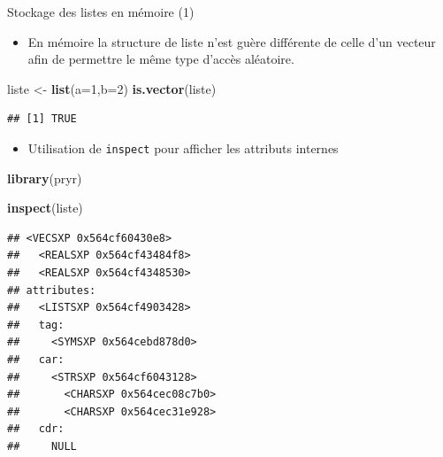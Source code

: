 \documentclass[
  ignorenonframetext,
]{beamer}
\newenvironment{Shaded}{\begin{snugshade}}{\end{snugshade}}
\newcommand{\AttributeTok}[1]{\textcolor[rgb]{0.13,0.29,0.53}{#1}}
\newcommand{\DecValTok}[1]{\textcolor[rgb]{0.00,0.00,0.81}{#1}}
\newcommand{\FunctionTok}[1]{\textcolor[rgb]{0.13,0.29,0.53}{\textbf{#1}}}
\newcommand{\NormalTok}[1]{#1}
\newcommand{\OtherTok}[1]{\textcolor[rgb]{0.56,0.35,0.01}{#1}}
\providecommand{\tightlist}{%
  \setlength{\itemsep}{0pt}\setlength{\parskip}{0pt}}
\begin{document}
\begin{frame}[fragile]{Stockage des listes en mémoire (1)}
\protect\hypertarget{stockage-des-listes-en-muxe9moire-1}{}
\begin{itemize}
\tightlist
\item
  En mémoire la structure de liste n'est guère différente de celle d'un
  vecteur afin de permettre le même type d'accès aléatoire.
\end{itemize}

\tiny

\begin{Shaded}
\begin{Highlighting}[]
\NormalTok{liste }\OtherTok{\textless{}{-}} \FunctionTok{list}\NormalTok{(}\AttributeTok{a=}\DecValTok{1}\NormalTok{,}\AttributeTok{b=}\DecValTok{2}\NormalTok{)}
\FunctionTok{is.vector}\NormalTok{(liste)}
\end{Highlighting}
\end{Shaded}

\begin{verbatim}
## [1] TRUE
\end{verbatim}

\normalsize

\begin{itemize}
\tightlist
\item
  Utilisation de \texttt{inspect} pour afficher les attributs internes
\end{itemize}

\tiny

\begin{Shaded}
\begin{Highlighting}[]
\FunctionTok{library}\NormalTok{(pryr)}

\FunctionTok{inspect}\NormalTok{(liste)}
\end{Highlighting}
\end{Shaded}

\begin{verbatim}
## <VECSXP 0x564cf60430e8>
##   <REALSXP 0x564cf43484f8>
##   <REALSXP 0x564cf4348530>
## attributes: 
##   <LISTSXP 0x564cf4903428>
##   tag: 
##     <SYMSXP 0x564cebd878d0>
##   car: 
##     <STRSXP 0x564cf6043128>
##       <CHARSXP 0x564cec08c7b0>
##       <CHARSXP 0x564cec31e928>
##   cdr: 
##     NULL
\end{verbatim}

\normalsize
\end{frame}
\end{document}
